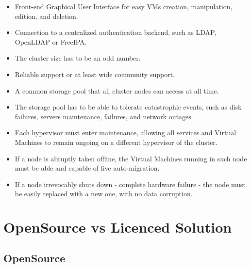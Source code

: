 \begin{itemize}
  \item Front-end Graphical User Interface for easy VMs creation, manipulation, edition, and deletion.
  \item Connection to a centralized authentication backend, such as LDAP, OpenLDAP or FreeIPA.
  \item The cluster size has to be an odd number.
  \item Reliable support or at least wide community support.
  \item A common storage pool that all cluster nodes can access at all time.
  \item The storage pool has to be able to tolerate catastrophic events, such as disk failures, servers maintenance, failures, and network outages.
  \item Each hypervisor must enter maintenance, allowing all services and Virtual Machines to remain ongoing on a different hypervisor of the cluster.
  \item If a node is abruptly taken offline, the Virtual Machines running in such node must be able and capable of live auto-migration.
  \item If a node irrevocably shuts down - complete hardware failure - the node must be easily replaced with a new one, with no data corruption.
\end{itemize}

\newpage
\section{OpenSource vs Licenced Solution}

\newpage
\subsection{OpenSource}

